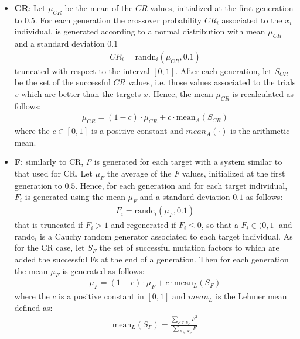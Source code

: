 \begin{itemize}
	\item{\textbf{CR}: Let $\mu_{\textit{CR}}$ be the mean of the $CR$ values, initialized at the first generation to $0.5$. For each generation the crossover probability $\textit{CR}_{i}$ associated to the $x_{i}$ individual, is generated according to a normal distribution with mean $\mu_{CR}$ and a standard deviation $0.1$
	\begin{align}
		\textit{CR}_{i} = \textrm{randn}_{i}(\mu_{\textit{CR}}, 0.1)
	\end{align}
	truncated with respect to the interval $[0, 1]$. \newline\newline
	After each generation, let $S_{CR}$ be the set of the successful $CR$ values, i.e. those values associated to the trials $v$ which are better than the targets $x$. Hence, the mean $\mu_{\textit{CR}}$ is recalculated as follows:
	\begin{align}
		\mu_{\textit{CR}} = (1 - c)\cdot\mu_{\textit{CR}} + c\cdot\textrm{mean}_{A}(S_{\textit{CR}})
	\end{align}
	where the $c\in[0,1]$ is a positive constant  and $mean_{A}(\cdot)$ is the arithmetic mean.	
	}
	\item{\textbf{F}: similarly to CR, \textit{F} is generated for each target with a system similar to that used for CR. Let $\mu_{F}$ the average of the $F$ values, initialized at the first generation to $0.5$. Hence, for each generation and for each target individual,  $F_{i}$ is generated using the mean $\mu_{F}$ and a standard deviation $0.1$ as follows:
		\begin{align}
			F_{i} = \textrm{randc}_{i}(\mu_{F}, 0.1)
		\end{align}
		that is truncated if $F_{i} > 1$ and regenerated if $F_{i} \leq 0$, so that a $F_{i} \in (0, 1]$ and $\textrm{randc}_{i}$ is a Cauchy random generator associated to each target individual.\newline\newline
As for the CR case, let $S_{\textit{F}}$ the set of successful mutation factors to which are added the successful Fs at the end of a generation. Then for each generation the mean $\mu_{F}$ is generated as follows:
		\begin{align}
			\mu_{F} = (1 - c)\cdot\mu_{F} + c\cdot\textrm{mean}_{L}(S_{F})
		\end{align}
		where the $c$ is a positive constant in $[0, 1]$ and $\textit{mean}_{L}$ is the Lehmer mean defined as:
		\begin{align}
			\textrm{mean}_{L}(S_{F}) = \frac{\sum\limits_{F \in S_{F}}F^{2}}{\sum\limits_{F \in S_{F}}F} 
		\end{align}
		}
\end{itemize}

